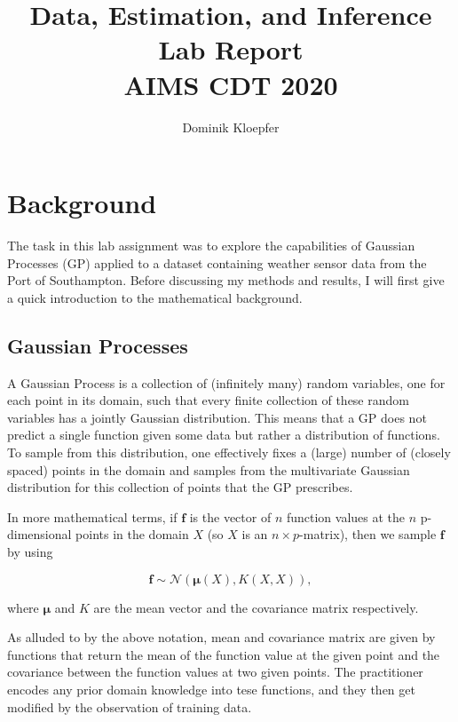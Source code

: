 \documentclass{article}
\title{Data, Estimation, and Inference Lab  Report \\
        \large{AIMS CDT 2020}}
\author{Dominik Kloepfer}
\begin{document}
    \maketitle

    \section{Background}
        The task in this lab assignment was to explore the capabilities of Gaussian Processes (GP) applied to a dataset containing weather sensor data from the Port of Southampton. Before discussing my methods and results, I will first give a quick introduction to the mathematical background.

        \subsection{Gaussian Processes}
            A Gaussian Process is a collection of (infinitely many) random variables, one for each point in its domain, such that every finite collection of these random variables has a jointly Gaussian distribution. This means that a GP does not predict a single function given some data but rather a distribution of functions. To sample from this distribution, one effectively fixes a (large) number of (closely spaced) points in the domain and samples from the multivariate Gaussian distribution for this collection of points that the GP prescribes.

            In more mathematical terms, if $\boldsymbol{f}$ is the vector of $n$ function values at the $n$ p-dimensional points in the domain $X$ (so $X$ is an $n\times p$-matrix), then we sample $\boldsymbol{f}$ by using

            \begin{equation}
                \boldsymbol{f} \sim \mathcal{N}(\boldsymbol{\mu}(X), K(X, X)),
            \end{equation}

            where $\boldsymbol{\mu}$ and $K$ are the mean vector and the covariance matrix respectively. 

            As alluded to by the above notation, mean and covariance matrix are given by functions that return the mean of the function value at the given point and the covariance between the function values at two given points. The practitioner encodes any prior domain knowledge into tese functions, and they then get modified by the observation of training data.\\
\end{document}
